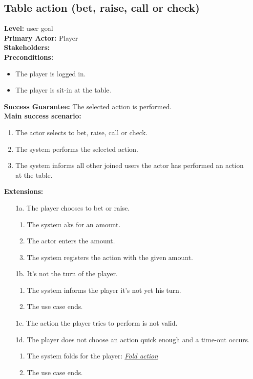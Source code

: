 \documentclass[a4paper,11pt]{report}
\begin{document}
\subsection{Table action (bet, raise, call or check)}
\textbf{Level:} user goal \\
\textbf{Primary Actor:} Player \\
\textbf{Stakeholders:} \\
\textbf{Preconditions:}
\begin{itemize}
\item The player is logged in.
\item The player is sit-in at the table.
\end{itemize}
\textbf{Success Guarantee:} The selected action is performed. \\
\textbf{Main success scenario:} 
\begin{enumerate}
\item The actor selects to bet, raise, call or check. 
\item The system performs the selected action. 
\item The system informs all other joined users the actor has performed an action at the table.
\end{enumerate}
\textbf{Extensions:}
\begin{itemize}
\item[1a.] The player chooses to bet or raise. 
\begin{enumerate}
\item The system aks for an amount.
\item The actor enters the amount. 
\item The system registers the action with the given amount.
\end{enumerate}
\item[1b.] It's not the turn of the player. 
\begin{enumerate}
\item The system informs the player it's not yet his turn. 
\item The use case ends.
\end{enumerate}
\item[1c.] The action the player tries to perform is not valid. 
\item[1d.] The player does not choose an action quick enough and a time-out occurs.
\begin{enumerate}
\item The system folds for the player: \emph{\underline{Fold action}}
\item The use case ends.
\end{enumerate}
\end{itemize}
\end{document}

